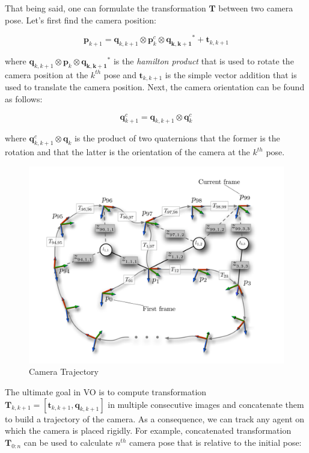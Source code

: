 \documentclass[a4paper]{report}
\numberwithin{figure}{section}
\begin{document}
That being said, one can formulate the transformation $\mathbf{T}$ 
between two camera pose. Let's first find the camera position:

\begin{equation}
  \mathbf{p}_{k+1} = 
  \mathbf{q}_{k,k+1} \otimes \mathbf{p}_k^c \otimes \mathbf{q_{k,k+1}}^* + 
  \mathbf{t}_{k,k+1}
\end{equation}

where $\mathbf{q}_{k,k+1} \otimes \mathbf{p}_k \otimes \mathbf{q_{k,k+1}}^*$ is the 
\textit{hamilton product} that is used to rotate the camera position at the $k^{th}$ pose 
and $\mathbf{t}_{k,k+1}$ is 
the simple vector addition that is used to translate the camera position. Next, 
the camera orientation can be found as follows:

\begin{equation}
  \mathbf{q}_{k+1}^c = 
  \mathbf{q}_{k,k+1} \otimes \mathbf{q}_{k}^c
\end{equation}

where $\mathbf{q}_{k,k+1}^c \otimes \mathbf{q}_{k}$ is the product of two 
quaternions that the former is the rotation and that the latter is the orientation 
of the camera at the $k^{th}$ pose.

\begin{figure}[H]
	\centering
  \includegraphics[width=0.7\linewidth,natwidth=640,natheight=640]
  {fig/ref_imgs/cam_trajectory.png}
  \caption{Camera Trajectory}
	\label{fig:cam_trajectory}
\end{figure}


The ultimate goal in VO is to compute transformation
$\mathbf{T}_{k,k+1}=[\mathbf{t}_{k,k+1},\mathbf{q}_{k,k+1}]$ in multiple consecutive 
images and concatenate them to build a trajectory of the camera.
As a consequence, we can track any agent on which the camera is placed rigidly. 
For example, concatenated transformation $\mathbf{T}_{0:n}$ 
can be used to calculate $n^{th}$ camera pose that is relative to the initial pose:
\end{document}
